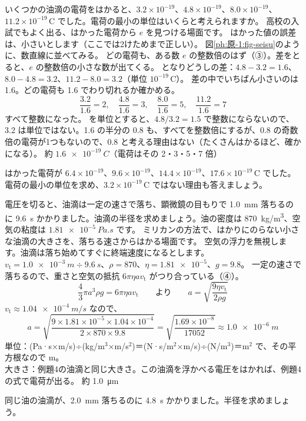 \label{ph:原-1:ex5}
\begin{phreidai}[ミリカンのデータから電気素量を]
いくつかの油滴の電荷をはかると、$3.2\times10^{-19}$、$4.8\times10^{-19}$、$8.0\times10^{-19}$、$11.2\times10^{-19}$\,C でした。電荷の最小の単位はいくらと考えられますか。
\phbamen
高校の入試でもよく出る、はかった電荷から $e$ を見つける場面です。
\phmushi
はかった値の誤差は、小さいとします（ここでは2けためまで正しい）。
\phzu
図\ref{ph:原-1:fig-seisu}のように、数直線に並べてみる。
\phriyu
どの電荷も、ある数 $e$ の整数倍のはず（③）。差をとると、$e$ の整数倍の小さな数が出てくる。
\phtateru
となりどうしの差：$4.8-3.2=1.6$、$8.0-4.8=3.2$、$11.2-8.0=3.2$（単位 $10^{-19}$\,C）。
\phtoku
差の中でいちばん小さいのは 1.6。どの電荷も 1.6 でわり切れるか確かめる。
\[ \frac{3.2}{1.6}=2,\quad\frac{4.8}{1.6}=3,\quad\frac{8.0}{1.6}=5,\quad\frac{11.2}{1.6}=7 \]
すべて整数になった。
 を単位とすると、$4.8/3.2=1.5$ で整数にならないので、3.2 は単位ではない。1.6 の半分の 0.8 も、すべてを整数倍にするが、0.8 の奇数倍の電荷が1つもないので、0.8 と考える理由はない（たくさんはかるほど、確かになる）。
\kotae 約 $\qty{1.6e-19}{C}$（電荷はその 2・3・5・7 倍）
\end{phreidai}
\begin{jibun}
はかった電荷が $6.4\times10^{-19}$、$9.6\times10^{-19}$、$14.4\times10^{-19}$、$17.6\times10^{-19}$\,C でした。電荷の最小の単位を求め、$3.2\times10^{-19}$\,C ではない理由も答えましょう。
\end{jibun}

\label{ph:原-1:ex6}
\begin{phreidai}[落ちる速さから油滴の大きさを]
電圧を切ると、油滴は一定の速さで落ち、顕微鏡の目もりで \qty{1.0}{mm} 落ちるのに \qty{9.6}{s} かかりました。油滴の半径を求めましょう。油の密度は \qty{870}{kg/m^3}、空気の粘度は $\qty{1.81e-5}{Pa.s}$ です。
\phbamen
ミリカンの方法で、はかりにのらない小さな油滴の大きさを、落ちる速さからはかる場面です。
\phmushi
空気の浮力を無視します。油滴は落ち始めてすぐに終端速度になるとします。
\phzu
$v_{\mathrm t}=\qty{1.0e-3}{m}\div\qty{9.6}{s}$、$\rho=870$、$\eta=\num{1.81e-5}$、$g=9.8$。
\phriyu
一定の速さで落ちるので、重さと空気の抵抗 $6\pi\eta av_{\mathrm t}$ がつり合っている（④）。
\phtateru
\[ \frac43\pi a^3\rho g=6\pi\eta av_{\mathrm t}\qquad\text{より}\qquad a=\sqrt{\frac{9\eta v_{\mathrm t}}{2\rho g}} \]
\phtoku
$v_{\mathrm t}\approx\qty{1.04e-4}{m/s}$ なので、
\[ a=\sqrt{\frac{9\times1.81\times10^{-5}\times1.04\times10^{-4}}{2\times870\times9.8}}=\sqrt{\frac{1.69\times10^{-8}}{\num{17052}}}\approx\qty{1.0e-6}{m} \]
\phtashikame
単位：(Pa·s×m/s)÷(kg/m$^3$×m/s$^2$)＝(N·s/m$^2$×m/s)÷(N/m$^3$)＝m$^2$ で、その平方根なので m。\\
大きさ：例題4の油滴と同じ大きさ。この油滴を浮かべる電圧をはかれば、例題4の式で電荷が出る。
\kotae 約 \qty{1.0}{\micro m}
\end{phreidai}
\begin{jibun}
同じ油の油滴が、\qty{2.0}{mm} 落ちるのに \qty{4.8}{s} かかりました。半径を求めましょう。
\end{jibun}

